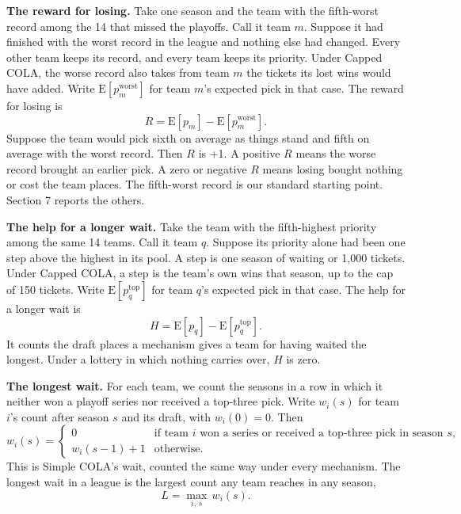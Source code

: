 \documentclass[11pt,letterpaper]{article}
\begin{document}
\textbf{The reward for losing.} Take one season and the team with the fifth-worst record among the 14 that missed the playoffs. Call it team $m$. Suppose it had finished with the worst record in the league and nothing else had changed. Every other team keeps its record, and every team keeps its priority. Under Capped COLA, the worse record also takes from team $m$ the tickets its lost wins would have added. Write $\mathrm{E}[p_m^{\mathrm{worst}}]$ for team $m$'s expected pick in that case. The reward for losing is
\begin{equation}\label{eq:reward}
R = \mathrm{E}[p_m] - \mathrm{E}[p_m^{\mathrm{worst}}].
\end{equation}
Suppose the team would pick sixth on average as things stand and fifth on average with the worst record. Then $R$ is +1. A positive $R$ means the worse record brought an earlier pick. A zero or negative $R$ means losing bought nothing or cost the team places. The fifth-worst record is our standard starting point. Section 7 reports the others.

\textbf{The help for a longer wait.} Take the team with the fifth-highest priority among the same 14 teams. Call it team $q$. Suppose its priority alone had been one step above the highest in its pool. A step is one season of waiting or 1,000 tickets. Under Capped COLA, a step is the team's own wins that season, up to the cap of 150 tickets. Write $\mathrm{E}[p_q^{\mathrm{top}}]$ for team $q$'s expected pick in that case. The help for a longer wait is
\begin{equation}\label{eq:help}
H = \mathrm{E}[p_q] - \mathrm{E}[p_q^{\mathrm{top}}].
\end{equation}
It counts the draft places a mechanism gives a team for having waited the longest. Under a lottery in which nothing carries over, $H$ is zero.

\textbf{The longest wait.} For each team, we count the seasons in a row in which it neither won a playoff series nor received a top-three pick. Write $w_i(s)$ for team $i$'s count after season $s$ and its draft, with $w_i(0) = 0$. Then
\begin{equation}\label{eq:count}
w_i(s) =
\begin{cases}
0 & \text{if team $i$ won a series or received a top-three pick in season $s$,} \\
w_i(s-1) + 1 & \text{otherwise.}
\end{cases}
\end{equation}
This is Simple COLA's wait, counted the same way under every mechanism. The longest wait in a league is the largest count any team reaches in any season,
\begin{equation}\label{eq:longest}
L = \max_{i,\,s} \, w_i(s).
\end{equation}
\end{document}
